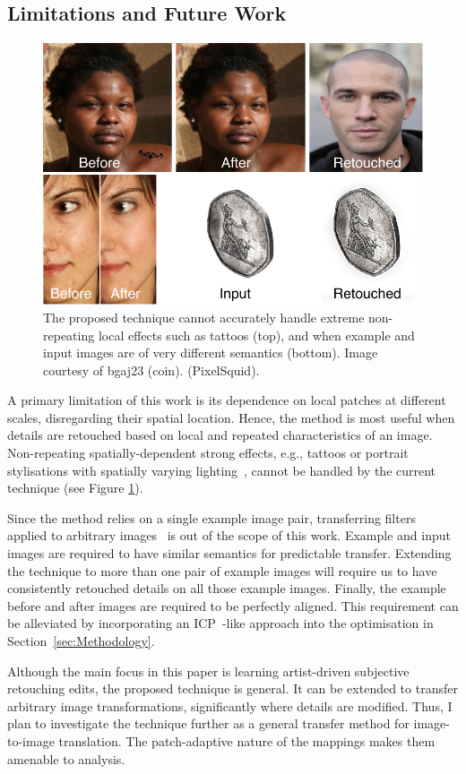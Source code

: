 \subsection{Limitations and Future Work}
\begin{figure}[th] %
	\centering
	\includegraphics[width=0.8\columnwidth]{Chapters/detail-retouching-figs/Limitations.pdf}
    \caption{\label{fig:limitations} The proposed technique cannot accurately handle extreme non-repeating local effects such as tattoos (top), and when example and input images are of very different semantics (bottom). Image courtesy of bgaj23 (coin). (PixelSquid).}

\end{figure}
A primary limitation of this work is its dependence on local patches at different scales, disregarding their spatial location. Hence, the method is most useful when details are retouched based on local and repeated characteristics of an image. Non-repeating spatially-dependent strong effects, e.g., tattoos or portrait stylisations with spatially varying lighting~\cite{Shih14Style}, cannot be handled by the current technique (see Figure \ref{fig:limitations}).


Since the method relies on a single example image pair, transferring filters applied to arbitrary images~\cite{Yan14Automatic} is out of the scope of this work. Example and input images are required to have similar semantics for predictable transfer. Extending the technique to more than one pair of example images will require us to have consistently retouched details on all those example images. Finally, the example before and after images are required to be perfectly aligned. This requirement can be alleviated by incorporating an ICP~\cite{Besl92AMethod}-like approach into the optimisation in Section~\ref{sec:Methodology}. 

Although the main focus in this paper is learning artist-driven subjective retouching edits, the proposed technique is general. It can be extended to transfer arbitrary image transformations, significantly where details are modified. Thus, I plan to investigate the technique further as a general transfer method for image-to-image translation. The patch-adaptive nature of the mappings makes them amenable to analysis.
